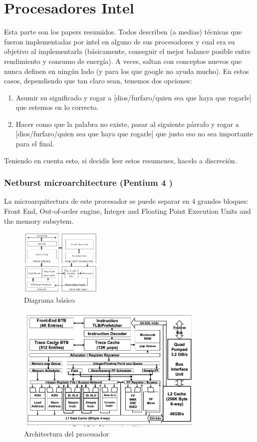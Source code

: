 \part{Procesadores Intel}
Esta parte son los papers resumidos. Todos describen (a medias) técnicas que fueron implementadas por intel en alguno de sus procesadores y cual era su objetivo al implementarla (básicamente, conseguir el mejor balance posible entre rendimiento y consumo de energía). A veces, saltan con conceptos nuevos que nunca definen en ningún lado (y para los que google no ayuda mucho). En estos casos, dependiendo que tan claro sean, tenemos dos opciones:
\begin{enumerate}
	\item Asumir su significado y rogar a [dios/furfaro/quien sea que haya que rogarle] que estemos en lo correcto.
	\item Hacer como que la palabra no existe, pasar al siguiente párrafo y rogar a [dios/furfaro/quien sea que haya que rogarle] que justo eso no sea importante para el final.
\end{enumerate}

Teniendo en cuenta esto, si decidis leer estos resumenes, hacelo a discreción.

\section{Netburst microarchitecture (Pentium 4 \cite{Sager01themicroarchitecture})}
La microarquitectura de este procesador se puede separar en 4 grandes bloques: Front End, Out-of-order engine, Integer and Floating Point Execution Units and the memory subsytem.

\begin{figure}[ht]
	\centering
	\includegraphics[width=0.35\textwidth]{imagenes/p4-block-architecture}
	\caption{Diagrama básico}
	\label{fig:p4DiagramaBasico}
\end{figure}
\begin{figure}[ht]
	\centering
	\includegraphics[width=0.8\textwidth]{imagenes/p4-architecture}
	\caption{Architectura del procesador}
	\label{fig:p4DiagramaCompleto}
\end{figure}

